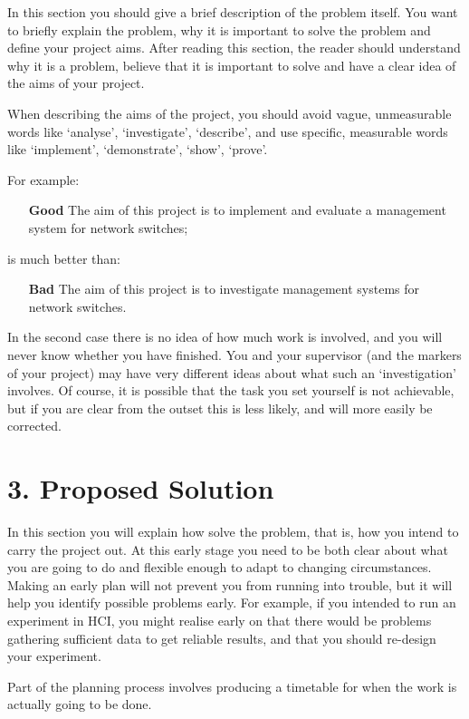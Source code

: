 \documentclass[11pt, a4paper, twoside, openright]{report}
\begin{document}
In this section you should give a brief description of the problem
itself. You want to briefly explain the problem, why it is important
to solve the problem and define your project aims. After reading this
section, the reader should understand why it is a problem, believe
that it is important to solve and have a clear idea of the aims of
your project.

When describing the aims of the project, you should avoid vague,
unmeasurable words like `analyse', `investigate', `describe', and use
specific, measurable words like `implement', `demonstrate', `show',
`prove'.

For example:

\begin{itemize}
\item[\bf Good] The aim of this project is to implement and evaluate a
  management system for network switches;
\end{itemize}
is much better than:
\begin{itemize}
\item[\bf Bad] The aim of this project is to investigate management
  systems for network switches.
\end{itemize}

In the second case there is no idea of how much work is involved, and
you will never know whether you have finished. You and your supervisor
(and the markers of your project) may have very different ideas about
what such an `investigation' involves. Of course, it is possible that
the task you set yourself is not achievable, but if you are clear from
the outset this is less likely, and will more easily be corrected.

\section*{3. Proposed Solution}

In this section you will explain how solve the problem, that is, how
you intend to carry the project out. At this early stage you need to
be both clear about what you are going to do and flexible enough to
adapt to changing circumstances. Making an early plan will not prevent
you from running into trouble, but it will help you identify possible
problems early. For example, if you intended to run an experiment in
HCI, you might realise early on that there would be problems gathering
sufficient data to get reliable results, and that you should re-design
your experiment.

Part of the planning process involves producing a timetable for when
the work is actually going to be done.
\end{document}
